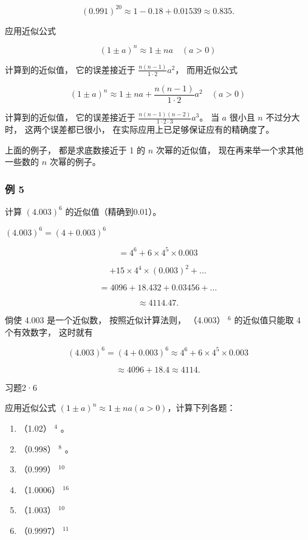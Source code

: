 \[
(0.991) ^ {20} \approx 1 - 0.18 + 0.01539 \approx 0.835.
\]

 应用近似公式

\[
(1 \pm a) ^ {n} \approx 1 \pm n a \quad (a > 0)
\]

计算到的近似值， 它的误差接近于 \(\frac{n(n-1)}{1 \cdot 2} a^2\)，
而用近似公式

\[
(1 \pm a) ^ {n} \approx 1 \pm n a + \frac {n (n - 1)}{1 \cdot 2} a ^ {2} \quad (a > 0)
\]

计算到的近似值， 它的误差接近于
\(\frac{n(n-1)(n-2)}{1 \cdot 2 \cdot 3} a^3\)。 当 \(a\) 很小且 \(n\)
不过分大时， 这两个误差都已很小， 在实际应用上已足够保证应有的精确度了。

上面的例子， 都是求底数接近于 1 的 \(n\) 次幂的近似值，
现在再来举一个求其他一些数的 \(n\) 次幂的例子。

\subsubsection{例 5}

计算 \((4.003)^{6}\) 的近似值（精确到0.01）。

 \((4.003)^{6} = (4 + 0.003)^{6}\)

\[
=4^6 + 6 \times 4 ^ {5} \times 0.003
\]

\[
+ 15 \times 4 ^ {4} \times (0.003) ^ {2} + \dots
\]

\[
= 4096 + 18.432 + 0.03456 + \dots
\]

\[
\approx 4114.47.
\]

 倘使 4.003 是一个近似数， 按照近似计算法则， （4.003）
\(^{6}\) 的近似值只能取 4 个有效数字， 这时就有

\[
(4.003) ^ {6} = (4 + 0.003) ^ {6} \approx 4 ^ {6} + 6 \times 4 ^ {5} \times 0.003
\]

\[
\approx 4096 + 18.4 \approx 4114.
\]

习题2·6

应用近似公式 \((1\pm a)^{n}\approx1\pm na(a>0)\)，计算下列各题：

\begin{enumerate}
\item
  （1.02） \(^{4}\) 。
\item
  （0.998） \(^{8}\) 。
\item
  （0.999） \(^{10}\)
\item
  （1.0006） \(^{16}\)
\item
  （1.003） \(^{10}\)
\item
  （0.9997） \(^{11}\)
\end{enumerate}


